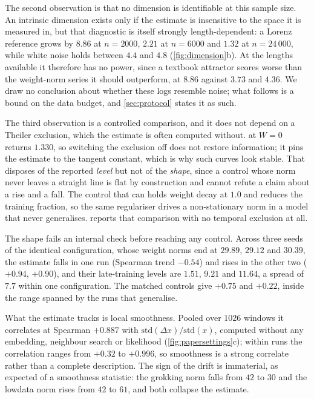 \documentclass{article}
\begin{document}
The second observation is that no dimension is identifiable at this sample size. An
intrinsic dimension exists only if the estimate is insensitive to the space it is measured
in, but that diagnostic is itself strongly length-dependent: a Lorenz reference grows by
$8.86$ at $n = 2000$, $2.21$ at $n = 6000$ and $1.32$ at $n = 24\,000$, while white noise
holds between $4.4$ and $4.8$ (\cref{fig:dimension}b). At the lengths available it
therefore has no power, since a textbook attractor scores worse than the weight-norm series
it should outperform, at $8.86$ against $3.73$ and $4.36$. We draw no conclusion about
whether these logs resemble noise; what follows is a bound on the data budget, and
\cref{sec:protocol} states it as such.

The third observation is a controlled comparison, and it does not depend on a Theiler
exclusion, which the estimate is often computed without.  at $W = 0$
returns $1.330$, so switching the exclusion off does not restore information; it pins the
estimate to the tangent constant, which is why such curves look stable. That disposes of
the reported \emph{level} but not of the \emph{shape}, since a control whose norm never
leaves a straight line is flat by construction and cannot refute a claim about a rise and a
fall. The control that can holds weight decay at $1.0$ and reduces the training fraction,
so the same regulariser drives a non-stationary norm in a model that never generalises.
 reports that comparison with no temporal exclusion at all.

The shape fails an internal check before reaching any control. Across three seeds of the
identical configuration, whose weight norms end at $29.89$, $29.12$ and $30.39$, the
estimate falls in one run (Spearman trend $-0.54$) and rises in the other two ($+0.94$,
$+0.90$), and their late-training levels are $1.51$, $9.21$ and $11.64$, a spread of $7.7$
within one configuration. The matched controls give $+0.75$ and $+0.22$, inside the range
spanned by the runs that generalise.

What the estimate tracks is local smoothness. Pooled over $1026$ windows it correlates at
Spearman $+0.887$ with $\mathrm{std}(\Delta x) / \mathrm{std}(x)$, computed without any
embedding, neighbour search or likelihood (\cref{fig:papersettings}c); within runs the
correlation ranges from $+0.32$ to $+0.996$, so smoothness is a strong correlate rather
than a complete description. The sign of the drift is immaterial, as expected of a
smoothness statistic: the grokking norm falls from $42$ to $30$ and the lowdata norm rises
from $42$ to $61$, and both collapse the estimate.
\end{document}
